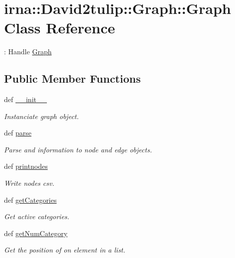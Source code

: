 \hypertarget{classirna_1_1David2tulip_1_1Graph_1_1Graph}{
\section{irna\-:\-:\-David2tulip\-:\-:\-Graph\-:\-:\-Graph \-Class \-Reference}
\label{classirna_1_1David2tulip_1_1Graph_1_1Graph}
}


\-: \-Handle \hyperlink{classirna_1_1David2tulip_1_1Graph_1_1Graph}{\-Graph}  


\subsection*{\-Public \-Member \-Functions}
\begin{DoxyCompactItemize}
\item 
def \hyperlink{classirna_1_1David2tulip_1_1Graph_1_1Graph_a37bbffcc5754f6a4a84f2c24cf7cd72e}{\-\_\-\-\_\-init\-\_\-\-\_\-}
\begin{DoxyCompactList}\small\item\em \-Instanciate graph object. \end{DoxyCompactList}\item 
def \hyperlink{classirna_1_1David2tulip_1_1Graph_1_1Graph_ad022c33975e87b5ddb72d268270e1b5f}{parse}
\begin{DoxyCompactList}\small\item\em \-Parse and information to node and edge objects. \end{DoxyCompactList}\item 
def \hyperlink{classirna_1_1David2tulip_1_1Graph_1_1Graph_a8b3d6ef99a64b55f399bda2d3ba49b8c}{printnodes}
\begin{DoxyCompactList}\small\item\em \-Write nodes csv. \end{DoxyCompactList}\item 
def \hyperlink{classirna_1_1David2tulip_1_1Graph_1_1Graph_a8a1b3d0ce7ea8ca9ce61a96e47c2fd29}{get\-Categories}
\begin{DoxyCompactList}\small\item\em \-Get active categories. \end{DoxyCompactList}\item 
def \hyperlink{classirna_1_1David2tulip_1_1Graph_1_1Graph_ad3fa5e3203410e25396b83a37e5fa42f}{get\-Num\-Category}
\begin{DoxyCompactList}\small\item\em \-Get the position of on element in a list. \end{DoxyCompactList}\item 

\end{DoxyCompactItemize}
